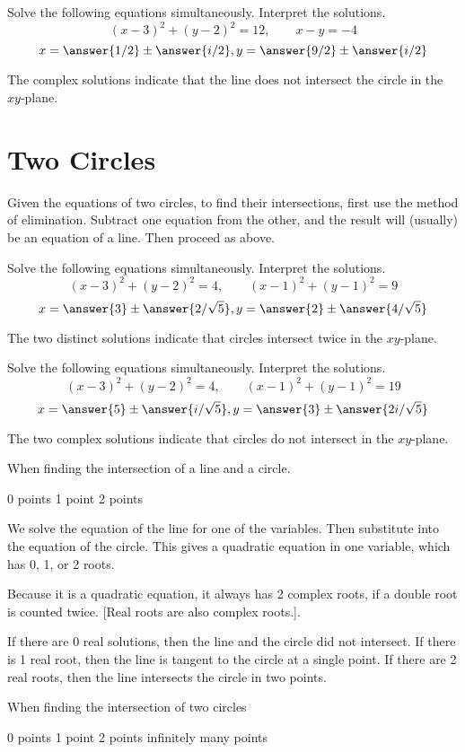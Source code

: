 \documentclass[nooutcomes]{ximera}
\begin{document}
\begin{problem}
Solve the following equations simultaneously.  Interpret the solutions.  
\[
(x-3)^2+(y-2)^2 = 12, \qquad x - y = -4
\]
\[
x  = \answer{1/2} \pm \answer{i/2}, y = \answer{9/2} \pm \answer{i/2}
\]
\begin{hint}
The complex solutions indicate that the line does not intersect the circle in the $xy$-plane.  
\end{hint}
\end{problem}

\section{Two Circles}
Given the equations of two circles, to find their intersections, first use the method of elimination.  Subtract one equation from the other, and the result will (usually) be an equation of a line.  Then proceed as above.  


\begin{problem}
Solve the following equations simultaneously.  Interpret the solutions.  
\[
(x-3)^2+(y-2)^2 = 4, \qquad (x-1)^2+(y-1)^2 = 9
\]
\[
x  = \answer{3} \pm \answer{2/\sqrt{5}}, y = \answer{2} \pm \answer{4/\sqrt{5}}
\]
\begin{hint}
The two distinct solutions indicate that circles intersect twice in the $xy$-plane.  
\end{hint}
\end{problem}


\begin{problem}
Solve the following equations simultaneously.  Interpret the solutions.  
\[
(x-3)^2+(y-2)^2 = 4, \qquad (x-1)^2+(y-1)^2 = 19
\]
\[
x  = \answer{5} \pm \answer{i/\sqrt{5}}, y = \answer{3} \pm \answer{2i/\sqrt{5}}
\]
\begin{hint}
The two complex solutions indicate that circles do not intersect in the $xy$-plane.  
\end{hint}
\end{problem}




When finding the intersection of a line and a circle. 

0 points
1 point
2 points

We solve the equation of the line for one of the variables.  Then substitute into the equation of the circle.  This gives a quadratic equation in one variable, which has 0, 1, or 2 roots.  

Because it is a quadratic equation, it always has 2 complex roots, if a double root is counted twice.  [Real roots are also complex roots.]. 

If there are 0 real solutions, then the line and the circle did not intersect. 
If there is 1 real root, then the line is tangent to the circle at a single point.  
If there are 2 real roots, then the line intersects the circle in two points.  



When finding the intersection of two circles

0 points
1 point
2 points
infinitely many points
\end{document}
